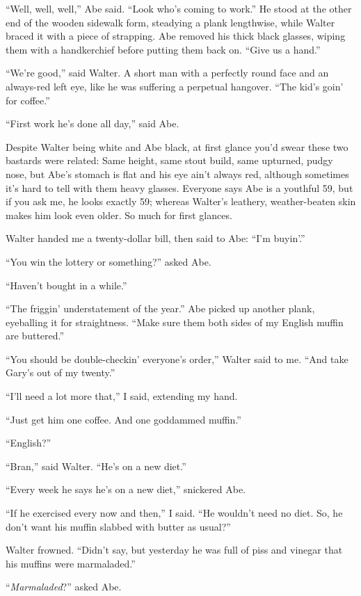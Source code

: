 ``Well, well, well,'' Abe said. ``Look who's coming to work.'' He stood
at the other end of the wooden sidewalk form, steadying a plank
lengthwise, while Walter braced it with a piece of strapping. Abe
removed his thick black glasses, wiping them with a handkerchief before
putting them back on. ``Give us a hand.'' ~

``We're good,'' said Walter. A short man with a perfectly round face and
an always-red left eye, like he was suffering a perpetual hangover.
``The kid's goin' for coffee.''

``First work he's done all day,'' said Abe.

Despite Walter being white and Abe black, at first glance you'd swear
these two bastards were related: Same height, same stout build, same
upturned, pudgy nose, but Abe's stomach is flat and his eye ain't always
red, although sometimes it's hard to tell with them heavy glasses.
Everyone says Abe is a youthful 59, but if you ask me, he looks exactly
59; whereas Walter's leathery, weather-beaten skin makes him look even
older. So much for first glances.

Walter handed me a twenty-dollar bill, then said to Abe: ``I'm buyin'.''
~~

``You win the lottery or something?'' asked Abe.

``Haven't bought in a while.''

``The friggin' understatement of the year.'' Abe picked up another
plank, eyeballing it for straightness. ``Make sure them both sides of my
English muffin are buttered.''

``You should be double-checkin' everyone's order,'' Walter said to me.
``And take Gary's out of my twenty.''

``I'll need a lot more that,'' I said, extending my hand.

``Just get him one coffee. And one goddammed muffin.''

``English?''

``Bran,'' said Walter. ``He's on a new diet.''

``Every week he says he's on a new diet,'' snickered Abe. ~~~

``If he exercised every now and then,'' I said. ``He wouldn't need no
diet. So, he don't want his muffin slabbed with butter as usual?''

Walter frowned. ``Didn't say, but yesterday he was full of piss and
vinegar that his muffins were marmaladed.''

``\emph{Marmaladed}?'' asked Abe.

